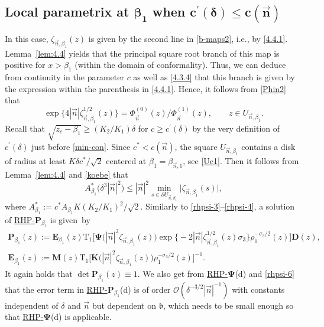 \documentclass[pdftex]{sigma}
\numberwithin{equation}{section}
\renewcommand{\det}{\operatorname{det}}
\newcommand{\n}{{\vec n}}
\newcommand{\rhp} {\textnormal{RHP}-${\boldsymbol P}$}
\newcommand{\rhpsi} {\textnormal{RHP}-${\boldsymbol \Psi}$}
\begin{document}
\subsection[Local parametrix at beta\_1 when c]{Local parametrix at $\boldsymbol{\beta_1} $ when $\boldsymbol{c^\prime(\delta)\leq c(\n)} $}

In this case, $ \zeta_{\n,\beta_1}(z) $ is given by the second line in \eqref{b-maps2}, i.e., by \eqref{4.4.1}. Lemma~\ref{lem:4.4} yields that the principal square root branch of this map is positive for $ x>\beta_1 $ (within the domain of conformality). Thus, we can deduce from continuity in the parameter $ c $ as well as \eqref{4.3.4} that this branch is given by the expression within the parenthesis in \eqref{4.4.1}. Hence, it follows from \eqref{Phin2} that
\[
\exp\bigl\{4|\n|\zeta_{\n,\beta_1}^{1/2}(z) \bigr\} = \Phi_\n^{(0)}(z)/\Phi_\n^{(1)}(z), \qquad z\in U_{\n,\beta_1}.
\]
Recall that $ \sqrt{z_c-\beta_1} \geq (K_2/K_1)\delta $ for $ c\geq c^\prime(\delta) $ by the very definition of $ c^\prime(\delta) $ just before \eqref{min-con}. Since $ c^*<c(\n) $, the square $ U_{\n,\beta_1} $ contains a disk of radius at least $ K\delta c^*/\sqrt 2 $ centered at $ \beta_1=\beta_{\n,1} $, see \eqref{Uc1}. Then it follows from Lemma~\ref{lem:4.4} and \eqref{koebe} that
\begin{equation}
\label{rhpsi-6}
A_{\beta_1}^* \bigl( \delta^3 |\n|^2\bigr) \leq |\n|^2 \min_{s\in\partial U_{\n,\beta_1}} \big|\zeta_{\n,\beta_1}(s)\big|,
\end{equation}
where $ A_{\beta_1}^* := c^*A_{\beta_1} K (K_2/K_1)^2/\sqrt2 $. Similarly to \eqref{rhpsi-3}--\eqref{rhpsi-4}, a solution of \hyperref[rhp]{\rhp$_{\beta_1}$} is given~by
\begin{gather*}
\boldsymbol P_{\beta_1}(z) := \boldsymbol E_{\beta_1}(z) \mathrm{T}_1\big[ \boldsymbol\Psi\bigl(|\n|^2\zeta_{\n,\beta_1}(z)\bigr) \exp\bigl\{-2|\n|\zeta_{\n,\beta_1}^{1/2}(z)\sigma_3 \bigr\} \rho_1^{-\sigma_3/2}(z) \big] \boldsymbol D(z), \\
\boldsymbol E_{\beta_1}(z) := \boldsymbol M(z)\mathrm{T}_1\big[ \boldsymbol K \bigl(|\n|^2\zeta_{\n,\beta_1}(z)\bigr) \rho_1^{-\sigma_3/2}(z)\big]^{-1}.
\end{gather*}
It again holds that $ \det \boldsymbol P_{\beta_1}(z) \equiv 1 $. We also get from \hyperref[rhpsi]{\rhpsi}(d) and \eqref{rhpsi-6} that the error term in \hyperref[rhp]{\rhp$_{\beta_1}$}(d) is of order $ \boldsymbol{\mathcal O}\left(\delta^{-3/2} |\n|^{-1} \right) $ with constants independent of $ \delta $ and $ \n $ but dependent on $ \mathfrak b $, which needs to be small enough so that \hyperref[rhpsi]{\rhpsi}(d) is applicable.
\end{document}
